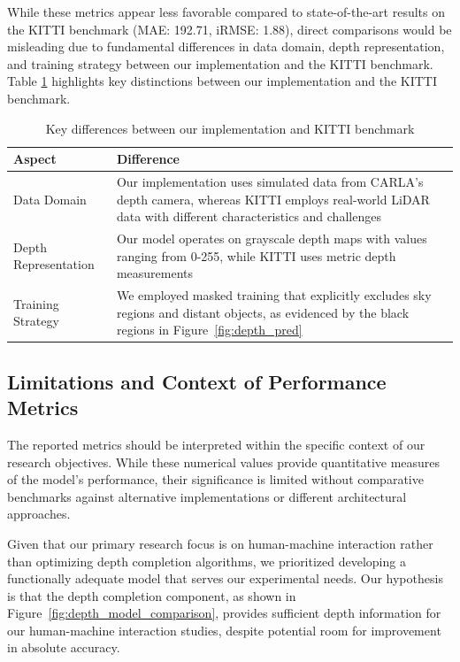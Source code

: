 While these metrics appear less favorable compared to state-of-the-art results on the KITTI benchmark (\ac{MAE}: 192.71, \ac{iRMSE}: 1.88), direct comparisons would be misleading due to fundamental differences in data domain, depth representation, and training strategy between our implementation and the KITTI benchmark. Table \ref{tab:implementation_differences} highlights key distinctions between our implementation and the KITTI benchmark.

\begin{table}[h]
\centering
\begin{tabular}{p{}p{}}
\hline
\textbf{Aspect} & \textbf{Difference} \\
\hline
Data Domain & Our implementation uses simulated data from CARLA's depth camera, whereas KITTI employs real-world \ac{LiDAR} data with different characteristics and challenges \\
Depth Representation & Our model operates on grayscale depth maps with values ranging from 0-255, while KITTI uses metric depth measurements \\
Training Strategy & We employed masked training that explicitly excludes sky regions and distant objects, as evidenced by the black regions in Figure~\ref{fig:depth_pred} \\
\hline
\end{tabular}
\caption{Key differences between our implementation and KITTI benchmark}
\label{tab:implementation_differences}
\end{table}

\subsection{Limitations and Context of Performance Metrics}

The reported metrics should be interpreted within the specific context of our research objectives. While these numerical values provide quantitative measures of the model's performance, their significance is limited without comparative benchmarks against alternative implementations or different architectural approaches.

Given that our primary research focus is on human-machine interaction rather than optimizing depth completion algorithms, we prioritized developing a functionally adequate model that serves our experimental needs. Our hypothesis is that the depth completion component, as shown in Figure~\ref{fig:depth_model_comparison}, provides sufficient depth information for our human-machine interaction studies, despite potential room for improvement in absolute accuracy.

